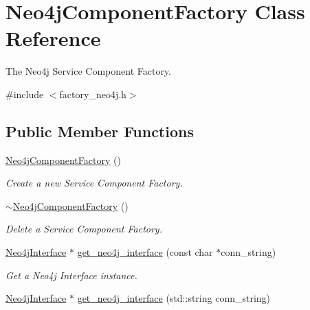 \hypertarget{classNeo4jComponentFactory}{}\section{Neo4j\+Component\+Factory Class Reference}
\label{classNeo4jComponentFactory}


The Neo4j Service Component Factory.  




{\ttfamily \#include $<$factory\+\_\+neo4j.\+h$>$}

\subsection*{Public Member Functions}
\begin{DoxyCompactItemize}
\item 
\hyperlink{classNeo4jComponentFactory_aedf2ef10ae4d076396a54eb8fd9f287c}{Neo4j\+Component\+Factory} ()\hypertarget{classNeo4jComponentFactory_aedf2ef10ae4d076396a54eb8fd9f287c}{}\label{classNeo4jComponentFactory_aedf2ef10ae4d076396a54eb8fd9f287c}

\begin{DoxyCompactList}\small\item\em Create a new Service Component Factory. \end{DoxyCompactList}\item 
\hyperlink{classNeo4jComponentFactory_a623c3195056c084fccbfd47364172295}{$\sim$\+Neo4j\+Component\+Factory} ()\hypertarget{classNeo4jComponentFactory_a623c3195056c084fccbfd47364172295}{}\label{classNeo4jComponentFactory_a623c3195056c084fccbfd47364172295}

\begin{DoxyCompactList}\small\item\em Delete a Service Component Factory. \end{DoxyCompactList}\item 
\hyperlink{classNeo4jInterface}{Neo4j\+Interface} $\ast$ \hyperlink{classNeo4jComponentFactory_a29ea434f83d7af4ca7b48480adeed0d0}{get\+\_\+neo4j\+\_\+interface} (const char $\ast$conn\+\_\+string)\hypertarget{classNeo4jComponentFactory_a29ea434f83d7af4ca7b48480adeed0d0}{}\label{classNeo4jComponentFactory_a29ea434f83d7af4ca7b48480adeed0d0}

\begin{DoxyCompactList}\small\item\em Get a Neo4j Interface instance. \end{DoxyCompactList}\item 
\hyperlink{classNeo4jInterface}{Neo4j\+Interface} $\ast$ \hyperlink{classNeo4jComponentFactory_af490a5e850cb6f3f1c0d0eae4b6dde81}{get\+\_\+neo4j\+\_\+interface} (std\+::string conn\+\_\+string)\hypertarget{classNeo4jComponentFactory_af490a5e850cb6f3f1c0d0eae4b6dde81}{}\label{classNeo4jComponentFactory_af490a5e850cb6f3f1c0d0eae4b6dde81}


\end{DoxyCompactItemize}
